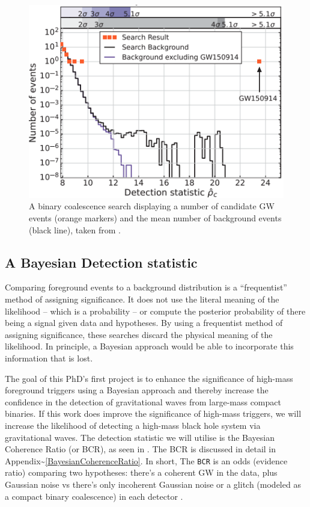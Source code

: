 \documentclass[%
 reprint,
 amsmath,amssymb,
 aps,
]{revtex4}
\begin{document}
\begin{figure}[!h]

{\centering \includegraphics[width=0.75\linewidth]{images/GW150914_background} 

}

\caption[Ranking statistic plot for GW150914]{A binary coalescence search displaying a number of candidate GW events (orange markers) and the mean number of background events (black line), taken from \citet{abbott2016observation}.}\label{fig:GW150914background}
\end{figure}

\hypertarget{a-bayesian-detection-statistic}{%
\subsection{A Bayesian Detection statistic}\label{a-bayesian-detection-statistic}}

Comparing foreground events to a background distribution is a ``frequentist'' method of assigning significance. It does
not use the literal meaning of the likelihood -- which is a probability -- or compute the posterior probability of there
being a signal given data and hypotheses. By using a frequentist method of assigning significance, these searches
discard the physical meaning of the likelihood. In principle, a Bayesian approach would be able to incorporate this
information that is lost.

The goal of this PhD's first project is to enhance the significance of high-mass foreground triggers using a Bayesian
approach and thereby increase the confidence in the detection of gravitational waves from large-mass compact binaries.
If this work does improve the significance of high-mass triggers, we will increase the likelihood of detecting a
high-mass black hole system via gravitational waves. The detection statistic we will utilise is the Bayesian Coherence
Ratio (or BCR), as seen in \citet{bcr_paper}. The BCR is discussed in detail in Appendix\textasciitilde\ref{BayesianCoherenceRatio}. In
short, The \texttt{BCR} is an odds (evidence ratio) comparing two hypotheses: there's a coherent GW in the data, plus Gaussian
noise vs there's only incoherent Gaussian noise or a glitch (modeled as a compact binary coalescence) in each detector
\citep{bcr_paper}.
\end{document}
